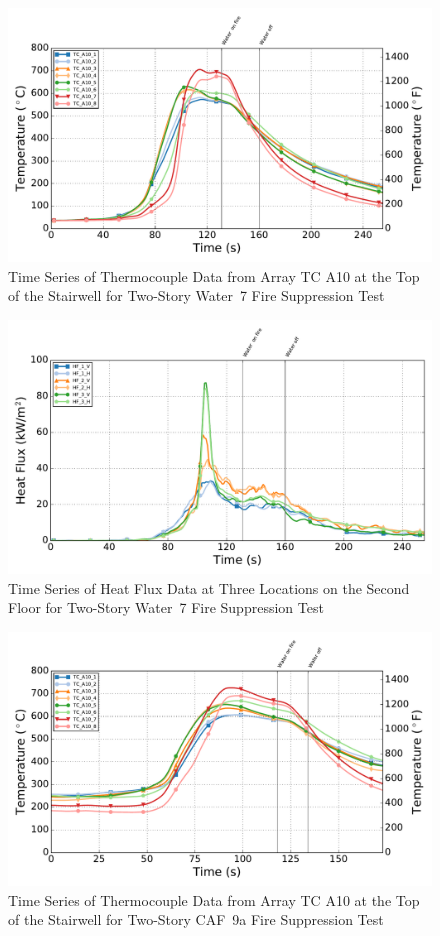 \documentclass[12pt,oneside]{book}
\begin{document}
\begin{figure}[!ht]
	\includegraphics[width=.85\columnwidth]{../Figures/Script_Figures/Test_39_West_061315_TC_A10}
	\caption{Time Series of Thermocouple Data from Array TC A10 at the Top of the Stairwell for Two-Story Water~7 Fire Suppression Test}
	\label{fig:water7_tca10}
\end{figure}

\begin{figure}[!ht]
	\includegraphics[width=.85\columnwidth]{../Figures/Script_Figures/Test_39_West_061315_Heat_Flux}
	\caption{Time Series of Heat Flux Data at Three Locations on the Second Floor for Two-Story Water~7 Fire Suppression Test}
	\label{fig:water7_hf}
\end{figure}

\begin{figure}[!ht]
	\includegraphics[width=.85\columnwidth]{../Figures/Script_Figures/Test_41_West_061415_TC_A10}
	\caption{Time Series of Thermocouple Data from Array TC A10 at the Top of the Stairwell for Two-Story CAF~9a Fire Suppression Test}
	\label{fig:caf9a_tca10}
\end{figure}
\end{document}
